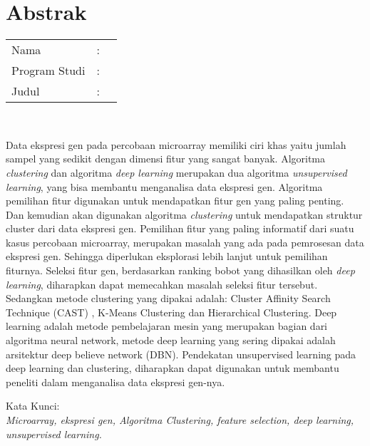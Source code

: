 %
%
%

\chapter*{Abstrak}

\vspace*{0.2cm}

\noindent \begin{tabular}{l l p{10cm}}
	Nama&: & \penulis \\
	Program Studi&: & \program \\
	Judul&: & \judul \\
\end{tabular} \\ 

\vspace*{0.5cm}

\noindent 
Data ekspresi gen pada percobaan microarray memiliki ciri khas yaitu jumlah sampel yang sedikit dengan dimensi fitur yang sangat banyak. Algoritma \textit{clustering}  dan algoritma \textit{deep learning} merupakan dua algoritma \textit{unsupervised learning}, yang bisa membantu menganalisa data ekspresi gen. Algoritma pemilihan fitur digunakan untuk mendapatkan fitur gen yang paling penting. Dan kemudian akan digunakan algoritma \textit{clustering} untuk mendapatkan struktur cluster dari data ekspresi gen. Pemilihan fitur yang paling informatif dari suatu kasus percobaan microarray, merupakan  masalah yang ada pada pemrosesan data ekspresi gen. Sehingga diperlukan eksplorasi lebih lanjut untuk pemilihan fiturnya. Seleksi fitur gen, berdasarkan ranking bobot yang dihasilkan oleh \textit{deep learning}, diharapkan dapat memecahkan masalah seleksi fitur tersebut. Sedangkan metode clustering yang dipakai adalah: Cluster Affinity Search Technique (CAST) , K-Means Clustering dan Hierarchical Clustering. Deep learning adalah metode pembelajaran mesin yang merupakan bagian dari algoritma neural network, metode deep learning yang sering dipakai adalah arsitektur deep believe network (DBN). Pendekatan unsupervised learning pada deep learning dan clustering, diharapkan dapat digunakan untuk membantu peneliti dalam menganalisa data ekspresi gen-nya.

\vspace*{0.2cm}

\noindent Kata Kunci: \\ 
\noindent 
\textit{Microarray, ekspresi gen, Algoritma Clustering, feature selection, deep learning, unsupervised learning.}

\newpage